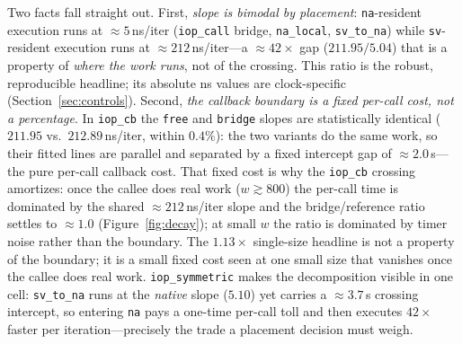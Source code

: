 \documentclass[conference]{IEEEtran}
\newcommand{\code}[1]{\texttt{#1}}
\begin{document}
Two facts fall straight out. First, \emph{slope is bimodal by placement}:
\code{na}-resident execution runs at $\approx$$5$\,ns/iter
(\code{iop\_call} bridge, \code{na\_local}, \code{sv\_to\_na}) while
\code{sv}-resident execution runs at $\approx$$212$\,ns/iter---a
$\approx$$42\times$ gap ($211.95/5.04$) that is a property of \emph{where the
work runs}, not of the crossing. This ratio is the robust, reproducible headline;
its absolute ns values are clock-specific (Section~\ref{sec:controls}). Second,
\emph{the callback boundary is a fixed per-call cost, not a percentage}. In
\code{iop\_cb} the \code{free} and \code{bridge} slopes are statistically
identical ($211.95$ vs.\ $212.89$\,ns/iter, within $0.4\%$): the two variants do
the same work, so their fitted lines are parallel and separated by a fixed
intercept gap of $\approx$$2.0$\,\textmu s---the pure per-call callback cost.
That fixed cost is why the \code{iop\_cb} crossing
amortizes: once the callee does real work ($w\gtrsim800$) the per-call time is
dominated by the shared $\approx$$212$\,ns/iter slope and the bridge/reference
ratio settles to $\approx$$1.0$ (Figure~\ref{fig:decay}); at small $w$ the ratio
is dominated by timer noise rather than the boundary. The
$1.13\times$ single-size headline is not a property of the boundary; it is a
small fixed cost seen at one small size that vanishes once the callee does real
work. \code{iop\_symmetric}
makes the decomposition visible in one cell: \code{sv\_to\_na} runs at the
\emph{native} slope ($5.10$) yet carries a $\approx$$3.7$\,\textmu s crossing
intercept, so entering \code{na} pays a one-time per-call toll and then executes
$42\times$ faster per iteration---precisely the trade a placement decision must
weigh.
\end{document}
